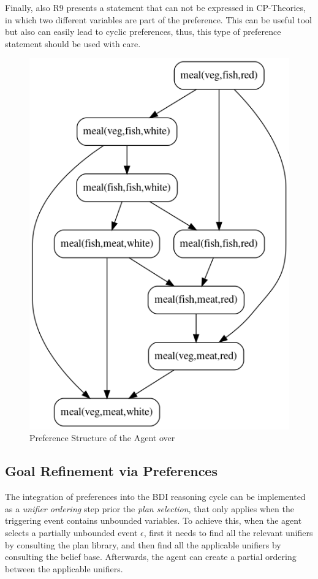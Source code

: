 Finally, also R9  presents a statement that can not be expressed in CP-Theories, in which two different variables are part of the preference. This can be useful tool but also can easily lead to cyclic preferences, thus, this type of preference statement should be used with care. 


\begin{figure}[!tbh]
  \centering
  \includegraphics[width=0.5\linewidth]{ch_aamas2021/cp-graph.png}
  \caption{Preference Structure of the Agent over }
  \label{fig:cp-graph}
  
\end{figure}

\subsection{Goal Refinement via Preferences}
\label{ssec:goalref}
The integration of preferences into the BDI reasoning cycle can be implemented as a \textit{unifier ordering} step prior the \textit{plan selection}, that only applies when the triggering event contains unbounded variables. To achieve this, when the agent selects a partially unbounded event $\epsilon$, first it needs to find all the relevant unifiers by consulting the plan library, and then find all the applicable unifiers by consulting the belief base. Afterwards, the agent can create a partial ordering between the applicable unifiers. 


